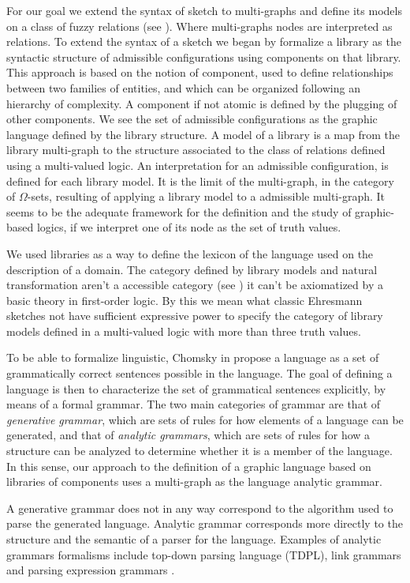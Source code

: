 \documentclass[oribibl]{llncs}
\begin{document}
For our goal we extend the syntax of sketch to multi-graphs and
define its models on a class of fuzzy relations (see \cite{Johnstone02}). Where multi-graphs nodes are interpreted as relations. To extend the
syntax of a sketch we began by formalize a library as the syntactic
structure of admissible configurations using components on that
library. This approach is based on the notion of component, used to
define relationships between two families of entities, and which can
be organized following an hierarchy of complexity. A
component if not atomic is defined by the plugging of other
components. We see the set of admissible configurations as the
graphic language defined by the library structure. A model of a
library is a map from the library multi-graph to the structure associated to the class of relations defined using a multi-valued logic. An interpretation for an
admissible configuration, is defined for each library model. It is
the limit of the multi-graph, in the category of $\Omega$-sets, resulting of applying a library model to a
admissible multi-graph. It seems to be the adequate framework for the definition and the study of graphic-based logics, if we interpret one of its node as the set of truth values.

We used libraries as a way to define the lexicon of the language used on the description of a domain. The category defined by library models and natural transformation aren't a accessible category (see \cite{Adamek94}) it can't be axiomatized by a basic theory in first-order logic. By this we mean what classic Ehresmann sketches not have sufficient expressive power to specify the category of library models defined in a multi-valued logic with more than three truth values.

To be able to formalize linguistic, Chomsky in \cite{chomsky57}
propose a language as a set of grammatically correct sentences
possible in the language. The goal of defining a language is then to
characterize the set of grammatical sentences explicitly, by means
of a formal grammar. The two main categories of grammar are that of
\emph{generative grammar}, which are sets of rules for how elements
of a language can be generated, and that of \emph{analytic
grammars}, which are sets of rules for how a structure can be
analyzed to determine whether it is a member of the language. In
this sense, our approach to the definition of a graphic language
based on libraries of components uses a multi-graph as the language
analytic grammar.

A generative grammar does not in any way correspond to the algorithm
used to parse the generated language. Analytic grammar corresponds
more directly to the structure and the semantic of a parser for the
language. Examples of analytic grammars formalisms include top-down parsing language (TDPL)\cite{Birman}, link
grammars \cite{Sleator91} and parsing expression grammars \cite{Ford04}.
\end{document}
